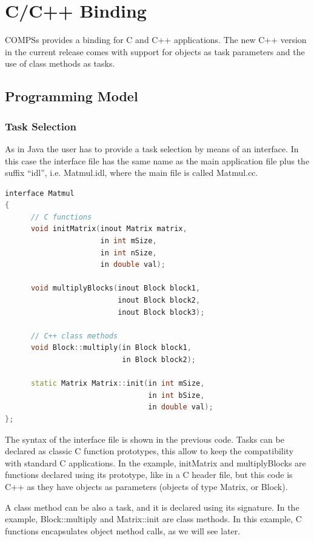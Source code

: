 \section{C/C++ Binding}
\label{sec:C}

COMPSs provides a binding for C and C++ applications. The new C++ version in the current release 
comes with support for objects as task parameters and the use of class methods as tasks.

\subsection{Programming Model}

\subsubsection{Task Selection}
As in Java the user has to provide a task selection by means of an interface. In this case 
the interface file has the same name as the main application file plus the suffix ``idl'', 
i.e. Matmul.idl, where the main file is called Matmul.cc.

\begin{lstlisting}[language=C++]
interface Matmul
{
      // C functions
      void initMatrix(inout Matrix matrix,
                      in int mSize,
                      in int nSize,
                      in double val);
                      
      void multiplyBlocks(inout Block block1,
                          inout Block block2,
                          inout Block block3);
                          
      // C++ class methods
      void Block::multiply(in Block block1,
                           in Block block2);
                           
      static Matrix Matrix::init(in int mSize,
                                 in int bSize,
                                 in double val);
};
\end{lstlisting}

The syntax of the interface file is shown in the previous code. Tasks can be declared as classic 
C function prototypes, this allow to keep the compatibility with standard C applications. 
In the example, initMatrix and multiplyBlocks are functions declared using its prototype, 
like in a C header file, but this code is C++ as they have objects as parameters (objects of 
type Matrix, or Block).

A class method can be also a task, and it is declared using its signature. In the example, 
Block::multiply and Matrix::init are class methods. In this example, C functions encapsulates 
object method calls, as we will see later.

